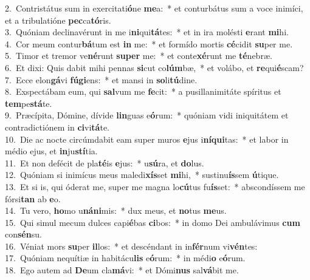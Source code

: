 {2.~}Contristátus sum in exercitati\textbf{ó}ne \textbf{me}a:~* et conturbátus sum a voce inimíci, et a tribulatióne \textbf{pec}ca\textbf{tó}ris.\\
{3.~}Quóniam declinavérunt in me i\textbf{ni}qui\textbf{tá}tes:~* et in ira molésti \textbf{e}rant \textbf{mi}hi.\\
{4.~}Cor meum contur\textbf{bá}tum est \textbf{in} me:~* et formído mortis \textbf{cé}cidit \textbf{su}per me.\\
{5.~}Timor et tremor ve\textbf{né}runt \textbf{su}\textbf{per} me:~* et conte\textbf{xé}runt me \textbf{té}nebræ.\\
{6.~}Et dixi: Quis dabit mihi pennas \textbf{si}cut co\textbf{lúm}bæ,~* et volábo, et \textbf{re}qui\textbf{é}scam?\\
{7.~}Ecce elon\textbf{gá}vi \textbf{fú}\textbf{gi}ens:~* et mansi in \textbf{so}li\textbf{tú}dine.\\
{8.~}Exspectábam eum, qui \textbf{sal}vum me \textbf{fe}cit:~* a pusillanimitáte spíritus et \textbf{tem}pe\textbf{stá}te.\\
{9.~}Præcípita, Dómine, dívide \textbf{lin}guas e\textbf{ó}rum:~* quóniam vidi iniquitátem et contradictiónem in \textbf{ci}vi\textbf{tá}te.\\
{10.~}Die ac nocte circúmdabit eam super muros \textbf{e}jus i\textbf{ní}\textbf{qui}tas:~* et labor in médio ejus, et \textbf{in}ju\textbf{stí}tia.\\
{11.~}Et non defécit de pla\textbf{té}is \textbf{e}jus:~* u\textbf{sú}ra, et \textbf{do}lus.\\
{12.~}Quóniam si inimícus meus maledi\textbf{xís}set \textbf{mi}hi,~* sustinu\textbf{ís}sem \textbf{ú}tique.\\
{13.~}Et si is, qui óderat me, super me magna lo\textbf{cú}tus fu\textbf{ís}set:~* abscondíssem me fórsi\textbf{tan} ab \textbf{e}o.\\
{14.~}Tu vero, \textbf{ho}mo u\textbf{ná}\textbf{ni}mis:~* dux meus, et \textbf{no}tus \textbf{me}us.\\
{15.~}Qui simul mecum dulces capi\textbf{é}bas \textbf{ci}bos:~* in domo Dei ambulávimus \textbf{cum} con\textbf{sén}su.\\
{16.~}Véniat mors \textbf{su}per \textbf{il}los:~* et descéndant in in\textbf{fér}num vi\textbf{vén}tes:\\
{17.~}Quóniam nequítiæ in habitácu\textbf{lis} e\textbf{ó}rum:~* in médi\textbf{o} e\textbf{ó}rum.\\
{18.~}Ego autem ad \textbf{De}um cla\textbf{má}vi:~* et Dómi\textbf{nus} sal\textbf{vá}bit me.\\

